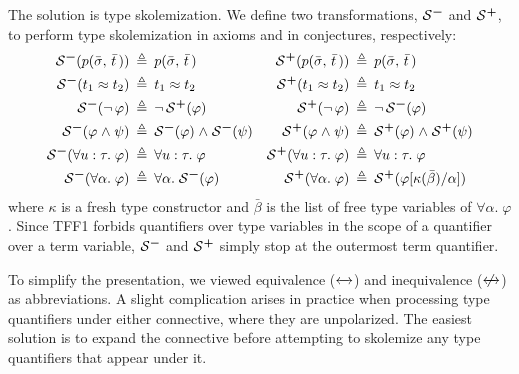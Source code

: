 The solution is type skolemization.
%
We define two transformations, $\SKOM$ and $\mathcal{S}\text{\textsuperscript{\kern.1ex\bfseries+}}$, to perform type
skolemization in axioms and in conjectures, respectively:
%
\begin{align*}
\SKOM(p(\bar{\sigma},\,\bar{t}\,)) &\eqdef p(\bar{\sigma},\,\bar{t}\,) &
\SKOP(p(\bar{\sigma},\,\bar{t}\,)) &\eqdef p(\bar{\sigma},\,\bar{t}\,) \\
\SKOM(t_1 \eq t_2) &\eqdef t_1 \eq t_2 &
\SKOP(t_1 \eq t_2) &\eqdef t_1 \eq t_2 \\
\SKOM(\lnot\, \varphi) &\eqdef \lnot\, \SKOP(\varphi) &
\SKOP(\lnot\, \varphi) &\eqdef \lnot\, \SKOM(\varphi) \\
\SKOM(\varphi \rand \psi) &\eqdef \SKOM(\varphi) \rand \SKOM(\psi) &
\SKOP(\varphi \rand \psi) &\eqdef \SKOP(\varphi) \rand \SKOP(\psi) \\
\SKOM(\forall u \ty \tau .\; \varphi) &\eqdef \forall u \ty \tau .\; \varphi &
\SKOP(\forall u \ty \tau .\; \varphi) &\eqdef \forall u \ty \tau .\; \varphi \\
\SKOM(\forall \alpha .\; \varphi) &\eqdef \forall \alpha .\; \SKOM(\varphi) &
\SKOP(\forall \alpha .\; \varphi) &\eqdef
\SKOP(\varphi[\kappa(\bar\beta)/\alpha])
\end{align*}
where $\kappa$ is a fresh type constructor and $\bar\beta$ is the list of free
type variables of $\forall \alpha .\; \varphi$.
Since TFF1 forbids quantifiers over type variables in the scope
of a quantifier over a term variable,
$\SKOM$ and $\mathcal{S}\text{\textsuperscript{\kern.1ex\bfseries+}}$ simply stop at the outermost term quantifier.

To simplify the presentation, we viewed equivalence ($\leftarrow\kern-1.75ex\rightarrow$) and inequivalence
($\kern.4875ex\not\kern-.4875ex\leftarrow\kern-1.75ex\rightarrow$) as abbreviations. A slight complication arises in practice when
processing type quantifiers under either connective, where they are unpolarized.
The easiest solution is to expand the connective before attempting to
skolemize any type quantifiers that appear under it.


